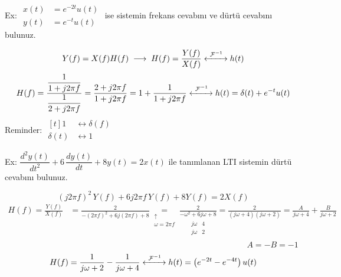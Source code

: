 \documentclass[11pt,a4paper]{article}
\begin{document}
\begin{ornek}
Ex: \quad $\begin{aligned} x(t)&=e^{-2t}u(t)\\ y(t)&=e^{-t}u(t)\end{aligned}$ \quad ise sistemin frekans cevabını ve dürtü cevabını bulunuz.
\end{ornek}
\[ Y(f)=X(f)H(f) \;\longrightarrow\; H(f)=\frac{Y(f)}{X(f)} \xleftrightarrow{\ \mathcal{F}^{-1}\ } h(t) \]
\[ H(f)=\frac{\dfrac{1}{1+j2\pi f}}{\dfrac{1}{2+j2\pi f}}=\frac{2+j2\pi f}{1+j2\pi f}=1+\frac{1}{1+j2\pi f} \xleftrightarrow{\ \mathcal{F}^{-1}\ } h(t)=\delta(t)+e^{-t}u(t) \]
Reminder: \quad $\begin{aligned}[t] 1 &\longleftrightarrow \delta(f)\\ \delta(t) &\longleftrightarrow 1\end{aligned}$

\begin{ornek}
Ex: \quad $\dfrac{d^2y(t)}{dt^2}+6\,\dfrac{dy(t)}{dt}+8y(t)=2x(t)$ \quad ile tanımlanan LTI sistemin dürtü cevabını bulunuz.
\end{ornek}
\[ (j2\pi f)^2\,Y(f)+6j2\pi f\,Y(f)+8Y(f)=2X(f) \]
\begin{align*}
H(f)=\frac{Y(f)}{X(f)} &= \frac{2}{-(2\pi f)^2+6j(2\pi f)+8}\underset{\substack{\uparrow\\ \omega=2\pi f}}{=}
\underset{\substack{\begin{array}{cc} j\omega & 4\\ j\omega & 2\end{array}}}{\frac{2}{-\omega^2+6j\omega+8}}
=\frac{2}{(j\omega+4)(j\omega+2)}=\frac{A}{j\omega+4}+\frac{B}{j\omega+2}\\
&\hspace{9cm} A=-B=-1
\end{align*}
\[ H(f)=\frac{1}{j\omega+2}-\frac{1}{j\omega+4} \xleftrightarrow{\ \mathcal{F}^{-1}\ } h(t)=\left(e^{-2t}-e^{-4t}\right)u(t) \]
\end{document}
